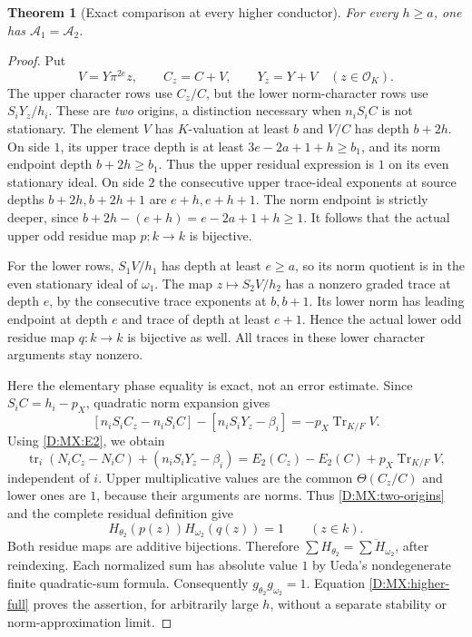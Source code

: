 \documentclass[11pt]{amsart}
\newtheorem{theorem}{Theorem}[section]
\theoremstyle{definition}
\theoremstyle{remark}
\newcommand{\Tr}{\operatorname{Tr}}
\newcommand{\OO}{\mathcal O}\newcommand{\pp}{\mathfrak p}\newcommand{\PP}{\mathfrak P}
\begin{document}
\begin{theorem}[Exact comparison at every higher conductor]\label{D:MX:higher}
For every $h\ge a$, one has $\mathcal A_1=\mathcal A_2$.
\end{theorem}
\begin{proof}
Put
\[
 V=Y\pi^{2e}z,\qquad C_z=C+V,\qquad Y_z=Y+V\quad(z\in\OO_K).
\]
The upper character rows use $C_z/C$, but the lower norm-character rows
use $S_iY_z/h_i$. These are \emph{two} origins, a distinction necessary
when $n_iS_iC$ is not stationary.
The element $V$ has $K$-valuation at least $b$ and $V/C$ has depth
$b+2h$. On side $1$, its upper trace depth is at least
$3e-2a+1+h\ge b_1$, and its norm endpoint depth $b+2h\ge b_1$.
Thus the upper residual expression is $1$ on its even stationary ideal.
On side $2$ the consecutive upper trace-ideal exponents at source depths
$b+2h,b+2h+1$ are $e+h,e+h+1$.
The norm endpoint is strictly deeper, since
$b+2h-(e+h)=e-2a+1+h\ge1$.
It follows that the actual upper odd residue map $p:k\to k$ is bijective.

For the lower rows, $S_1V/h_1$ has depth at least $e\ge a$, so its norm
quotient is in the even stationary ideal of $\omega_1$.
The map $z\mapsto S_2V/h_2$ has a nonzero graded trace at depth $e$,
by the consecutive trace exponents at $b,b+1$. Its lower norm has
leading endpoint at depth $e$ and trace of depth at least $e+1$.
Hence the actual lower odd residue map $q:k\to k$ is bijective as well.
All traces in these lower character arguments stay nonzero.

Here the elementary phase equality is exact, not an error estimate.
Since $S_iC=h_i-p_X$, quadratic norm expansion gives
\[
 [n_iS_iC_z-n_iS_iC]-[n_iS_iY_z-\beta_i]=-p_X\Tr_{K/F}V.
\]
Using \eqref{D:MX:E2}, we obtain
\begin{equation}\label{D:MX:two-origins}
 \operatorname{tr}_i(N_iC_z-N_iC)+(n_iS_iY_z-\beta_i)
  =E_2(C_z)-E_2(C)+p_X\Tr_{K/F}V,
\end{equation}
independent of $i$.
Upper multiplicative values are the common $\Theta(C_z/C)$ and lower
ones are $1$, because their arguments are norms. Thus \eqref{D:MX:two-origins}
and the complete residual definition give
\[
 H_{\theta_2}(p(z))H_{\omega_2}(q(z))=1\qquad(z\in k).
\]
Both residue maps are additive bijections. Therefore
$\sum H_{\theta_2}=\overline{\sum H_{\omega_2}}$, after reindexing.
Each normalized sum has absolute value $1$ by Ueda's nondegenerate
finite quadratic-sum formula. Consequently
$g_{\theta_2}g_{\omega_2}=1$.
Equation \eqref{D:MX:higher-full} proves the assertion, for arbitrarily large
$h$, without a separate stability or norm-approximation limit.
\end{proof}
\end{document}
